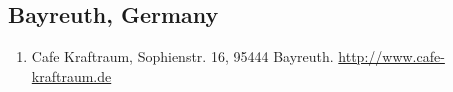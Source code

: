 \subsection{Bayreuth, Germany}
\begin{enumerate}
 \item Cafe Kraftraum, Sophienstr. 16, 95444 Bayreuth. \href{http://www.cafe-kraftraum.de}{http://www.cafe-kraftraum.de}
\end{enumerate}

